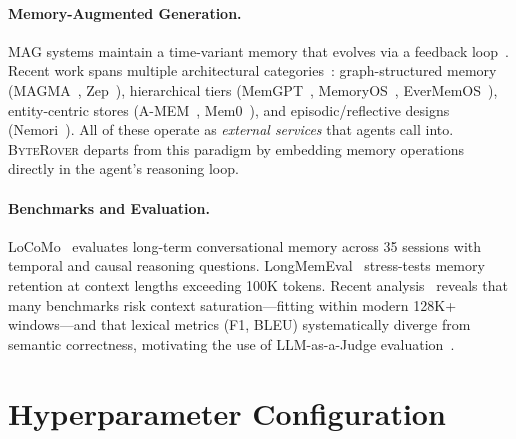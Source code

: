 \documentclass[11pt]{article}
\newcommand{\byterover}{\textsc{ByteRover}}
\begin{document}
\paragraph{Memory-Augmented Generation.}
MAG systems maintain a time-variant memory that evolves via a feedback loop~\citep{zhong2024memorybank,park2023generative}.
Recent work spans multiple architectural categories~\citep{jiang2026anatomy}:
graph-structured memory (MAGMA~\citep{jiang2026magma}, Zep~\citep{rasmussen2025zep}),
hierarchical tiers (MemGPT~\citep{packer2023memgpt}, MemoryOS~\citep{kang2025memoryos},
EverMemOS~\citep{hu2026evermemos}),
entity-centric stores (A-MEM~\citep{xu2025amem}, Mem0~\citep{chhikara2025mem0}),
and episodic/reflective designs (Nemori~\citep{nan2025nemori}).
All of these operate as \emph{external services} that agents call into.
\byterover{} departs from this paradigm by embedding memory operations
directly in the agent's reasoning loop.

\paragraph{Benchmarks and Evaluation.}
LoCoMo~\citep{maharana2024locomo} evaluates long-term conversational memory
across 35 sessions with temporal and causal reasoning questions.
LongMemEval~\citep{wu2024longmemeval} stress-tests memory retention
at context lengths exceeding 100K tokens.
Recent analysis~\citep{jiang2026anatomy} reveals that many benchmarks
risk context saturation---fitting within modern 128K+ windows---and
that lexical metrics (F1, BLEU) systematically diverge from semantic correctness,
motivating the use of LLM-as-a-Judge evaluation~\citep{zheng2023llmjudge}.


\section{Hyperparameter Configuration}
\label{app:hyperparameters}
\end{document}
